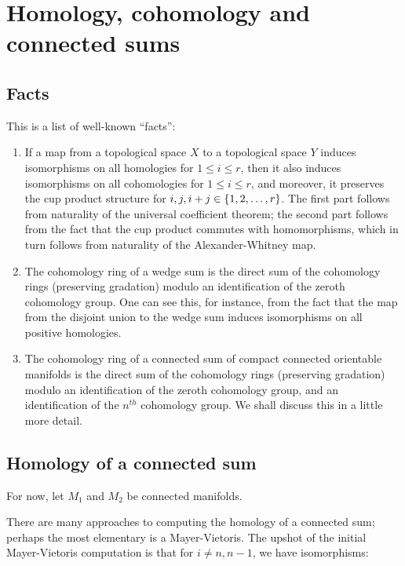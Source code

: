 \documentclass[a4paper]{amsart}
\begin{document}
\section{Homology, cohomology and connected sums}

\subsection{Facts}

This is a list of well-known ``facts'':

\begin{enumerate}

\item If a map from a topological space $X$ to a topological space $Y$
  induces isomorphisms on all homologies for $1 \le i \le r$, then it
  also induces isomorphisms on all cohomologies for $1 \le i \le r$,
  and moreover, it preserves the cup product structure for $i,j,i + j
  \in \left\{ 1,2, \ldots, r \right\}$. The first part follows from naturality of the
  universal coefficient theorem; the second part follows from the fact
  that the cup product commutes with homomorphisms, which in turn
  follows from naturality of the Alexander-Whitney map.

\item The cohomology ring of a wedge sum is the direct sum of the
  cohomology rings (preserving gradation) modulo an identification of
  the zeroth cohomology group. One can see this, for instance, from
  the fact that the map from the disjoint union to the wedge sum
  induces isomorphisms on all positive homologies.

\item The cohomology ring of a connected sum of compact connected
  orientable manifolds is the direct sum of the cohomology rings
  (preserving gradation) modulo an identification of the zeroth
  cohomology group, and an identification of the $n^{th}$ cohomology
  group. We shall discuss this in a little more detail.

\end{enumerate}

\subsection{Homology of a connected sum}

For now, let $M_1$ and $M_2$ be connected manifolds.

There are many approaches to computing the homology of a connected
sum; perhaps the most elementary is a Mayer-Vietoris. The upshot of
the initial Mayer-Vietoris computation is that for $i \ne n, n-1$, we
have isomorphisms:
\end{document}
